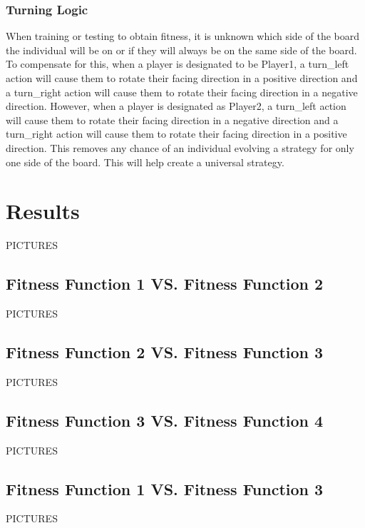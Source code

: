 \documentclass{acm_proc_article-sp}
\begin{document}
\subsubsection{Turning Logic} %

When training or testing to obtain fitness, it is unknown which side of the board the individual will be on or if they will always be on the same side of the board. To compensate for this, when a player is designated to be Player1, a turn\_left action will cause them to rotate their facing direction in a positive direction and a turn\_right action will cause them to rotate their facing direction in a negative direction. However, when a player is designated as Player2, a turn\_left action will cause them to rotate their facing direction in a negative direction and a turn\_right action will cause them to rotate their facing direction in a positive direction. This removes any chance of an individual evolving a strategy for only one side of the board. This will help create a universal strategy.

\section{Results} %

PICTURES

\subsection{Fitness Function 1 VS. Fitness Function 2}

PICTURES

\subsection{Fitness Function 2 VS. Fitness Function 3}

PICTURES

\subsection{Fitness Function 3 VS. Fitness Function 4}

PICTURES

\subsection{Fitness Function 1 VS. Fitness Function 3}

PICTURES
\end{document}
